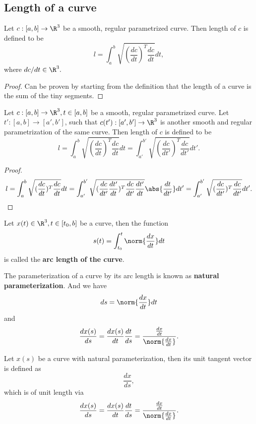 \begin{refsection}
\subsection{Length of a curve}



\begin{theorem}\cite[26]{kreyszig2013differential}\label{ch:differential-geometry--riemannian-manifolds:th:curvelength}
Let $c:[a,b]\to \R^3$ be a smooth, regular parametrized curve. Then length of $c$ is defined to be
$$l = \int_{a}^b \sqrt{(\frac{dc}{dt})^T\frac{dc}{dt}}dt,$$
where
$dc/dt \in \R^3.$
\end{theorem}
\begin{proof}
Can be proven by starting from the definition that the length of a curve is the sum of the tiny segments. 
\end{proof}

\begin{lemma}\cite[27]{kreyszig2013differential}
Let $c:[a,b]\to \R^3,t\in [a,b]$ be a smooth, regular parametrized curve. Let $t':[a,b]\to [a',b']$, such that $c(t'):[a',b']\to \R^3$ is another smooth and regular parametrization of the same curve.  Then length of $c$ is defined to be
$$l = \int_{a}^b \sqrt{(\frac{dc}{dt})^T\frac{dc}{dt}}dt = \int_{a'}^{b'}\sqrt{(\frac{dc}{dt'})^T\frac{dc}{dt'}}dt'.$$
\end{lemma}
\begin{proof}
	$$l = \int_{a}^b \sqrt{(\frac{dc}{dt})^T\frac{dc}{dt}}dt = \int_{a'}^{b'}\sqrt{(\frac{dc}{dt'}\frac{dt'}{dt})^T\frac{dc}{dt'}\frac{dt'}{dt}}\abs{\frac{dt}{dt'}}dt' = \int_{a'}^{b'}\sqrt{(\frac{dc}{dt'})^T\frac{dc}{dt'}}dt'.$$
\end{proof}

\begin{definition}\cite[28]{kreyszig2013differential}
Let $x(t) \in \R^3, t\in [t_0,b]$ be a curve, then the function
$$s(t) = \int_{t_0}^t \norm{\frac{dx}{dt}} dt $$ 
is called the \textbf{ arc length of the curve}.

The parameterization of a curve by its arc length is known as \textbf{natural parameterization}. And we have
$$ds = \norm{\frac{dx}{dt}} dt$$
and 
$$\frac{dx(s)}{ds} = \frac{dx(s)}{dt}\frac{dt}{ds} = \frac{\frac{dx}{dt}}{\norm{\frac{dx}{dt}}}.$$
\end{definition}

\begin{definition}\cite[29]{kreyszig2013differential}
	Let $x(s)$ be a curve with natural parameterization, then its unit tangent vector is defined as
	$$\frac{dx}{ds},$$
	which is of unit length via 
	$$\frac{dx(s)}{ds} = \frac{dx(s)}{dt}\frac{dt}{ds} = \frac{\frac{dx}{dt}}{\norm{\frac{dx}{dt}}}.$$
\end{definition}


\end{refsection}
